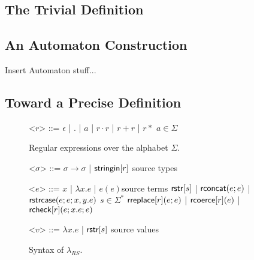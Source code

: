 \documentclass[12pt]{article}
\theoremstyle{definition}
\newcommand{\sisubst}[3]{{\sf rreplace}[#1](#2;#3)} \newcommand{\rreplace}[3]{{\sf rreplace}[#1](#2;#3)} %
\newcommand{\rcoerce}[2]{{\sf rcoerce}[#1](#2)}
\newcommand{\sistr}[1]{{\sf rstr}[#1]}   \newcommand{\rstr}[1]{{\sf rstr}[#1]} %
\newcommand{\rcheck}[4]{ {\sf rcheck}[#1](#2;#3;#4) }
\newcommand{\strin}[1]{\sistr{#1}}
\newcommand{\rsconcat}[2]{{\sf rconcat}(#1;#2)} \newcommand{\rconcat}[2]{{\sf rconcat}(#1;#2)} %
\newcommand{\stringin}[1]{{\sf stringin}[#1]}
\newcommand{\strcase}[3]{ {\sf rstrcase}(#1; #2; #3)}
\begin{document}
\subsection{The Trivial Definition}

\subsection{An Automaton Construction}

Insert Automaton stuff...


\subsection{Toward a Precise Definition}







\renewcommand{\grammarlabel}[2]{#1\hfill#2}
\begin{figure}[b]
\small
  \begin{grammar}
<$r$> ::= $\epsilon$ | $.$ | $a$ | $r \cdot r$ | $r + r$ | $r*$ \hfill $a \in \Sigma$

\caption{Regular expressions over the alphabet $\Sigma$.}
\label{fig:regex}
\end{grammar}
\end{figure}
\begin{figure}[t]
\small
  \begin{grammar}
<$\sigma$> ::=  $\sigma \rightarrow \sigma$ | $\stringin{r}$    \hfill  source types

<$e$> ::= 
      $x$ | $\lambda x . e$ | $e(e) $\hfill source terms \alt 
      $\strin{s}$ | $\rsconcat{e}{e}$ | $\strcase{e}{e}{x,y.e}$ \hfill $s \in \Sigma^{*}$ \alt
      $\sisubst{r}{e}{e}$ | $\rcoerce{r}{e}$ | $\rcheck{r}{e}{x.e}{e}$

<$v$> ::= $\lambda x . e$ | $\strin{s}$ \hfill source values 
\caption{Syntax of $\lambda_{RS}$.}
\label{fig:glambdas}
\end{grammar}
\end{figure}


\renewcommand{\grammarlabel}[2]{#1\hfill#2}
\end{document}
